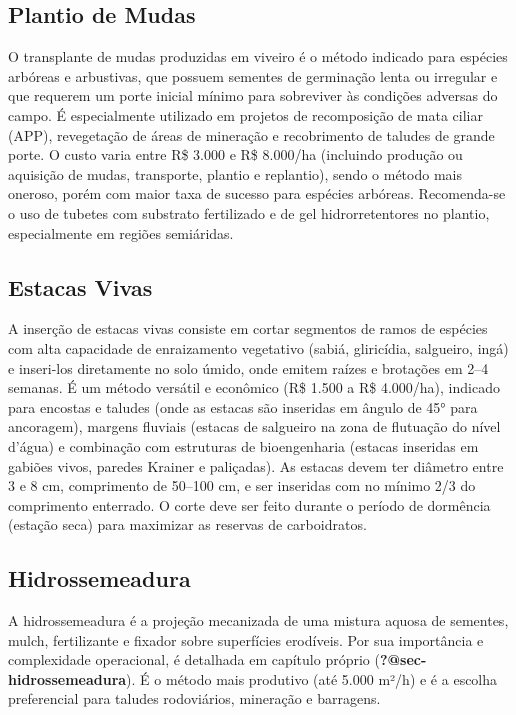 \documentclass[
  portuguese,
  11pt,
  a4paper,
  open=any]{scrbook}
\begin{document}
\subsection{Plantio de Mudas}\label{plantio-de-mudas}

O transplante de mudas produzidas em viveiro é o método indicado para
espécies arbóreas e arbustivas, que possuem sementes de germinação lenta
ou irregular e que requerem um porte inicial mínimo para sobreviver às
condições adversas do campo. É especialmente utilizado em projetos de
recomposição de mata ciliar (APP), revegetação de áreas de mineração e
recobrimento de taludes de grande porte. O custo varia entre R\$ 3.000 e
R\$ 8.000/ha (incluindo produção ou aquisição de mudas, transporte,
plantio e replantio), sendo o método mais oneroso, porém com maior taxa
de sucesso para espécies arbóreas. Recomenda-se o uso de tubetes com
substrato fertilizado e de gel hidrorretentores no plantio,
especialmente em regiões semiáridas.

\subsection{Estacas Vivas}\label{estacas-vivas}

A inserção de estacas vivas consiste em cortar segmentos de ramos de
espécies com alta capacidade de enraizamento vegetativo (sabiá,
gliricídia, salgueiro, ingá) e inseri-los diretamente no solo úmido,
onde emitem raízes e brotações em 2--4 semanas. É um método versátil e
econômico (R\$ 1.500 a R\$ 4.000/ha), indicado para encostas e taludes
(onde as estacas são inseridas em ângulo de 45° para ancoragem), margens
fluviais (estacas de salgueiro na zona de flutuação do nível d'água) e
combinação com estruturas de bioengenharia (estacas inseridas em gabiões
vivos, paredes Krainer e paliçadas). As estacas devem ter diâmetro entre
3 e 8 cm, comprimento de 50--100 cm, e ser inseridas com no mínimo 2/3
do comprimento enterrado. O corte deve ser feito durante o período de
dormência (estação seca) para maximizar as reservas de carboidratos.

\subsection{Hidrossemeadura}\label{hidrossemeadura}

A hidrossemeadura é a projeção mecanizada de uma mistura aquosa de
sementes, mulch, fertilizante e fixador sobre superfícies erodíveis. Por
sua importância e complexidade operacional, é detalhada em capítulo
próprio (\textbf{?@sec-hidrossemeadura}). É o método mais produtivo (até
5.000 m²/h) e é a escolha preferencial para taludes rodoviários,
mineração e barragens.
\end{document}
